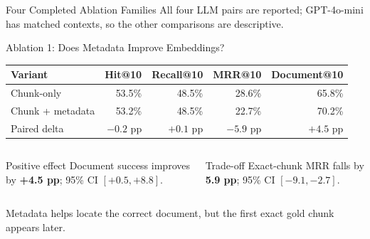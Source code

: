 \begin{frame}[t]{Four Completed Ablation Families}
\scriptsize
\centering
{}
\vspace{0.15cm}
All four LLM pairs are reported; GPT-4o-mini has matched contexts, so the other comparisons are descriptive.
\end{frame}

\begin{frame}{Ablation 1: Does Metadata Improve Embeddings?}
\scriptsize
\centering
\begin{tabular}{lrrrr}
\toprule
\textbf{Variant} & \textbf{Hit@10} & \textbf{Recall@10} & \textbf{MRR@10} & \textbf{Document@10} \\
\midrule
Chunk-only & 53.5\% & 48.5\% & 28.6\% & 65.8\% \\
Chunk + metadata & 53.2\% & 48.5\% & 22.7\% & 70.2\% \\
Paired delta & $-0.2$ pp & $+0.1$ pp & $-5.9$ pp & $+4.5$ pp \\
\bottomrule
\end{tabular}
\vspace{0.35cm}
\begin{columns}[T]
    \begin{block}{Positive effect}
    Document success improves by \textbf{+4.5 pp}; 95\% CI $[+0.5,+8.8]$.
    \end{block}
    \begin{alertblock}{Trade-off}
    Exact-chunk MRR falls by \textbf{5.9 pp}; 95\% CI $[-9.1,-2.7]$.
    \end{alertblock}
\end{columns}
\vspace{0.1cm}
\centering
Metadata helps locate the correct document, but the first exact gold chunk appears later.
\end{frame}

